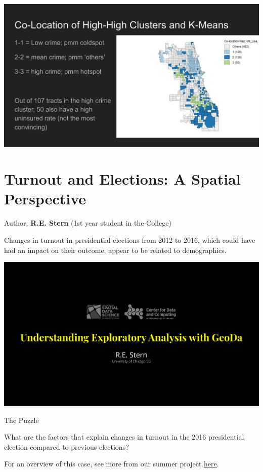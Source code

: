 \documentclass[
]{book}
\begin{document}
\includegraphics{images/health5.png}

\hypertarget{turnout-and-elections-a-spatial-perspective}{%
\section{Turnout and Elections: A Spatial Perspective}\label{turnout-and-elections-a-spatial-perspective}}

Author: \textbf{R.E. Stern} (1st year student in the College)

Changes in turnout in presidential elections from 2012 to 2016, which could have had an impact on their outcome, appear to be related to demographics.

\includegraphics{images/elections1.png}

The Puzzle

What are the factors that explain changes in turnout in the 2016 presidential election compared to previous elections?

For an overview of this case, see more from our summer project \href{https://uchicago.box.com/s/5wu1l2zz8tbwlxm9frvruuicx6ogtw2b}{here}.
\end{document}
